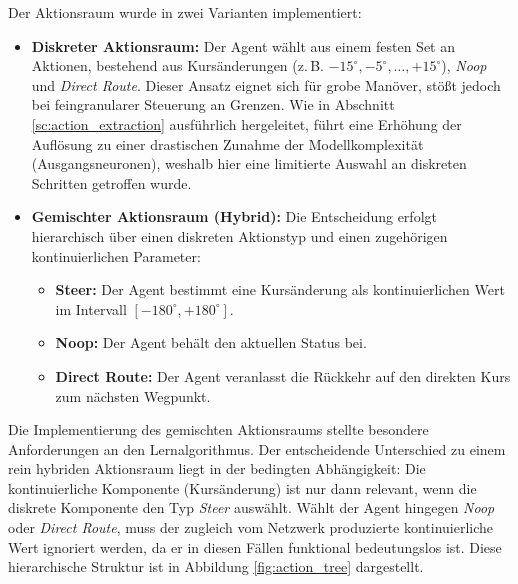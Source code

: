 Der Aktionsraum wurde in zwei Varianten implementiert:
\begin{itemize}
    \item \textbf{Diskreter Aktionsraum:} Der Agent wählt aus einem festen Set an Aktionen, bestehend aus Kursänderungen (z.\,B. $-15^\circ, -5^\circ, \dots, +15^\circ$), \emph{Noop} und \emph{Direct Route}.
    Dieser Ansatz eignet sich für grobe Manöver, stößt jedoch bei feingranularer Steuerung an Grenzen. Wie in Abschnitt \ref{sc:action_extraction} ausführlich hergeleitet, führt eine Erhöhung der Auflösung zu einer drastischen Zunahme der Modellkomplexität (Ausgangsneuronen), weshalb hier eine limitierte Auswahl an diskreten Schritten getroffen wurde.
    \item \textbf{Gemischter Aktionsraum (Hybrid):} Die Entscheidung erfolgt hierarchisch über einen diskreten Aktionstyp und einen zugehörigen kontinuierlichen Parameter:
    \begin{itemize}
        \item \textbf{Steer:} Der Agent bestimmt eine Kursänderung als kontinuierlichen Wert im Intervall $[-180^\circ, +180^\circ]$.
        \item \textbf{Noop:} Der Agent behält den aktuellen Status bei.
        \item \textbf{Direct Route:} Der Agent veranlasst die Rückkehr auf den direkten Kurs zum nächsten Wegpunkt.
    \end{itemize}
\end{itemize}

Die Implementierung des gemischten Aktionsraums stellte besondere Anforderungen an den Lernalgorithmus. 
Der entscheidende Unterschied zu einem rein hybriden Aktionsraum liegt in der bedingten Abhängigkeit: Die kontinuierliche Komponente (Kursänderung) ist nur dann relevant, wenn die diskrete Komponente den Typ \textit{Steer} auswählt.
Wählt der Agent hingegen \textit{Noop} oder \textit{Direct Route}, muss der zugleich vom Netzwerk produzierte kontinuierliche Wert ignoriert werden, da er in diesen Fällen funktional bedeutungslos ist.
Diese hierarchische Struktur ist in Abbildung \ref{fig:action_tree} dargestellt.

